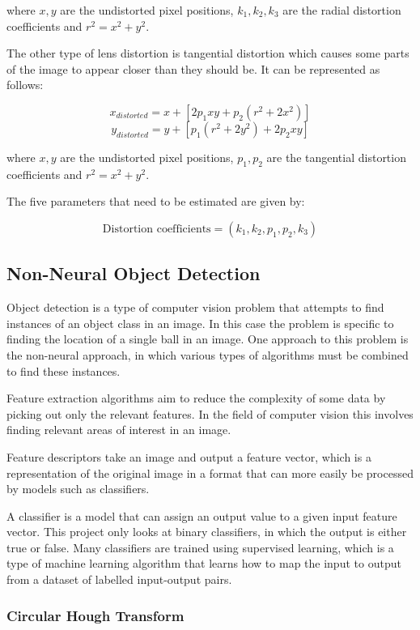 \noindent where $x, y$ are the undistorted pixel positions, $k_1, k_2, k_3$ are the radial distortion coefficients and $r^2 = x^2 + y^2$.

The other type of lens distortion is tangential distortion which causes some parts of the image to appear closer than they should be. It can be represented as follows: 

\[ x_{distorted} = x + [2 p_1 x y + p_2(r^2 + 2 x^2)] \]
\[ y_{distorted} = y +[p_1 (r^2 + 2 y^2) + 2 p_2 x y] \]

\noindent where $x, y$ are the undistorted pixel positions, $p_1, p_2$ are the tangential distortion coefficients and $r^2 = x^2 + y^2$.

The five parameters that need to be estimated are given by:

\[ \text{Distortion coefficients} = (k_1, k_2, p_1, p_2, k_3) \] 

\nocite{Zhang2000}
\nocite{Heikkila1997}
\nocite{Ling2019}

\subsection{Non-Neural Object Detection}

Object detection is a type of computer vision problem that attempts to find instances of an object class in an image. In this case the problem is specific to finding the location of a single ball in an image. One approach to this problem is the non-neural approach, in which various types of algorithms must be combined to find these instances. 

Feature extraction algorithms aim to reduce the complexity of some data by picking out only the relevant features. In the field of computer vision this involves finding relevant areas of interest in an image. 

Feature descriptors take an image and output a feature vector, which is a representation of the original image in a format that can more easily be processed by models such as classifiers. 

A classifier is a model that can assign an output value to a given input feature vector. This project only looks at binary classifiers, in which the output is either true or false. Many classifiers are trained using supervised learning, which is a type of machine learning algorithm that learns how to map the input to output from a dataset of labelled input-output pairs. 

\subsubsection{Circular Hough Transform}

